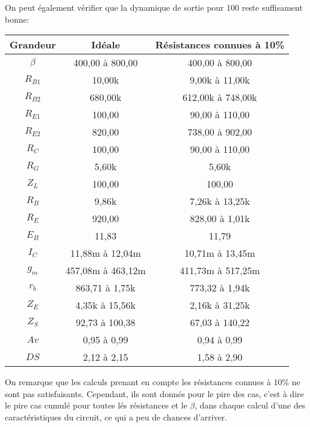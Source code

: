   On peut également vérifier que la dynamique de sortie pour 100\ohm{}
   reste suffisament bonne:


   \begin{tabular}{|c|c|c|}
    \hline
    Grandeur  & Idéale           &   Résistances connues à 10\% \\\hline
    $\beta$   & 400,00 à 800,00  & 400,00 à 800,00 \\\hline
    $R_{B1}$  &      10,00k      & 9,00k à 11,00k  \\\hline
    $R_{B2}$  &     680,00k      &612,00k à 748,00k\\\hline
    $R_{E1}$  &      100,00      & 90,00 à 110,00  \\\hline
    $R_{E2}$  &      820,00      & 738,00 à 902,00 \\\hline
    $R_C$     &      100,00      & 90,00 à 110,00  \\\hline
    $R_G$     &      5,60k       &      5,60k       \\\hline
    $Z_L$     &      100,00      &      100,00      \\\hline
    $R_B$     &      9,86k       & 7,26k à 13,25k  \\\hline
    $R_E$     &      920,00      & 828,00 à 1,01k  \\\hline
    $E_B$     &      11,83       &      11,79       \\\hline
    $I_C$     & 11,88m à 12,04m  & 10,71m à 13,45m \\\hline
    $g_m$     &457,08m à 463,12m &411,73m à 517,25m\\\hline
    $r_b$     & 863,71 à 1,75k   & 773,32 à 1,94k  \\\hline
    $Z_E$     & 4,35k à 15,56k   & 2,16k à 31,25k  \\\hline
    $Z_S$     & 92,73 à 100,38   & 67,03 à 140,22  \\\hline
    $Av$      &   0,95 à 0,99    &   0,94 à 0,99   \\\hline
    $DS$      &   2,12 à 2,15    &   1,58 à 2,90\\\hline
   \end{tabular}


   On remarque que les calculs prenant en compte les résistances connues à 10\% 
   ne sont pas satisfaisants. Cependant, ils sont donnés pour le pire des cas,
   c’est à dire le pire cas cumulé pour toutes lés résistances et le $\beta$, dans chaque calcul
   d’une des caractéristiques du circuit, ce qui a peu de chances d’arriver.

